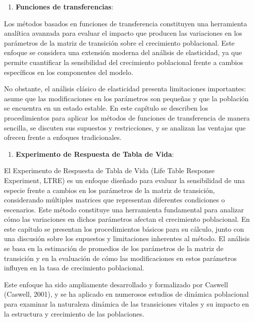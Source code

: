 \documentclass[
  12pt,
  letterpaper,
]{book}
\providecommand{\tightlist}{%
  \setlength{\itemsep}{0pt}\setlength{\parskip}{0pt}}\usepackage{longtable,booktabs,array}
\begin{document}
\begin{enumerate}
\def\labelenumi{\arabic{enumi}.}
\setcounter{enumi}{10}
\tightlist
\item
  \textbf{Funciones de transferencias}:
\end{enumerate}

Los métodos basados en funciones de transferencia constituyen una
herramienta analítica avanzada para evaluar el impacto que producen las
variaciones en los parámetros de la matriz de transición sobre el
crecimiento poblacional. Este enfoque se considera una extensión moderna
del análisis de elasticidad, ya que permite cuantificar la sensibilidad
del crecimiento poblacional frente a cambios específicos en los
componentes del modelo.

No obstante, el análisis clásico de elasticidad presenta limitaciones
importantes: asume que las modificaciones en los parámetros son pequeñas
y que la población se encuentra en un estado estable. En este capítulo
se describen los procedimientos para aplicar los métodos de funciones de
transferencia de manera sencilla, se discuten sus supuestos y
restricciones, y se analizan las ventajas que ofrecen frente a enfoques
tradicionales.

\begin{enumerate}
\def\labelenumi{\arabic{enumi}.}
\setcounter{enumi}{11}
\tightlist
\item
  \textbf{Experimento de Respuesta de Tabla de Vida}:
\end{enumerate}

El Experimento de Respuesta de Tabla de Vida (Life Table Response
Experiment, LTRE) es un enfoque diseñado para evaluar la sensibilidad de
una especie frente a cambios en los parámetros de la matriz de
transición, considerando múltiples matrices que representan diferentes
condiciones o escenarios. Este método constituye una herramienta
fundamental para analizar cómo las variaciones en dichos parámetros
afectan el crecimiento poblacional. En este capítulo se presentan los
procedimientos básicos para su cálculo, junto con una discusión sobre
los supuestos y limitaciones inherentes al método. El análisis se basa
en la estimación de promedios de los parámetros de la matriz de
transición y en la evaluación de cómo las modificaciones en estos
parámetros influyen en la tasa de crecimiento poblacional.

Este enfoque ha sido ampliamente desarrollado y formalizado por Caswell
(Caswell, 2001), y se ha aplicado en numerosos estudios de dinámica
poblacional para examinar la naturaleza dinámica de las transiciones
vitales y su impacto en la estructura y crecimiento de las poblaciones.
\end{document}
